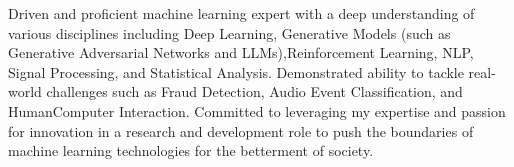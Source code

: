 Driven and proficient machine learning expert with a deep understanding of various disciplines including Deep Learning, Generative Models (such as Generative Adversarial Networks and LLMs),Reinforcement Learning, NLP, Signal Processing, and Statistical Analysis. Demonstrated ability to tackle real-world challenges such as Fraud Detection, Audio Event Classification, and HumanComputer Interaction. Committed to leveraging my expertise and passion for innovation in a research and development role to push the boundaries of machine learning technologies for the betterment of society.
